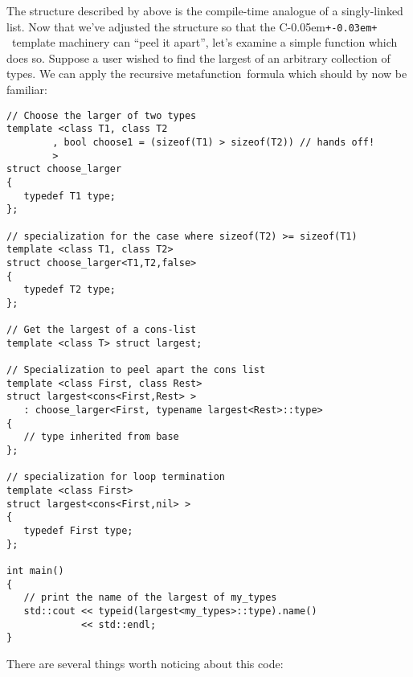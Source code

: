 \documentclass{kapproc}
\newcommand{\Cpp}{C\kern-0.05em\texttt{+\kern-0.03em+}%
}
\newcommand{\mfn}{meta\-func\-tion}
\begin{document}
The structure described by  above is the compile-time
analogue of a singly-linked list. Now that we've adjusted the
structure so that the \Cpp\ template machinery can ``peel it apart'',
let's examine a simple function which does so. Suppose a user wished
to find the largest of an arbitrary collection of types. We can apply
the recursive \mfn\ formula which should by now be familiar:

{\small
\begin{codesamp}\begin{verbatim}
// Choose the larger of two types
template <class T1, class T2
        , bool choose1 = (sizeof(T1) > sizeof(T2)) // hands off!
        >
struct choose_larger
{
   typedef T1 type;
};

// specialization for the case where sizeof(T2) >= sizeof(T1)
template <class T1, class T2>
struct choose_larger<T1,T2,false>
{
   typedef T2 type;
};

// Get the largest of a cons-list
template <class T> struct largest;

// Specialization to peel apart the cons list
template <class First, class Rest>
struct largest<cons<First,Rest> >
   : choose_larger<First, typename largest<Rest>::type>
{
   // type inherited from base
};

// specialization for loop termination
template <class First>
struct largest<cons<First,nil> >
{
   typedef First type;
};

int main()
{
   // print the name of the largest of my_types
   std::cout << typeid(largest<my_types>::type).name()
             << std::endl;
}

\end{verbatim}
\end{codesamp}
}

There are several things worth noticing about this code:
\end{document}

